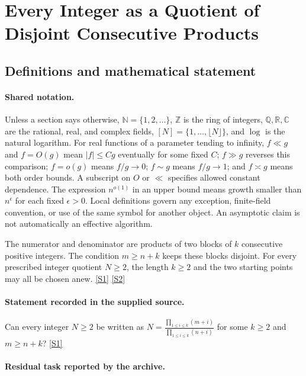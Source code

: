 \documentclass[11pt,a4paper]{article}
\newcommand{\N}{\mathbb{N}}
\newcommand{\Z}{\mathbb{Z}}
\newcommand{\Q}{\mathbb{Q}}
\newcommand{\R}{\mathbb{R}}
\newcommand{\C}{\mathbb{C}}
\newcommand{\sref}[2]{\hyperlink{source:#1:#2}{[S#2]}}
\begin{document}
\section{Every Integer as a Quotient of Disjoint Consecutive Products}\label{statement}


\subsection{Definitions and mathematical statement}

\paragraph{Shared notation.}Unless a section says otherwise, $\N=\{1,2,\ldots\}$,
$\Z$ is the ring of integers, $\Q,\R,\C$ are the rational, real, and complex
fields, $[N]=\{1,\ldots,\lfloor N\rfloor\}$, and $\log$ is the natural
logarithm. For real functions of a parameter tending to infinity,
$f\ll g$ and $f=O(g)$ mean $|f|\leq Cg$ eventually for some fixed $C$;
$f\gg g$ reverses this comparison; $f=o(g)$ means $f/g\to0$;
$f\sim g$ means $f/g\to1$; and $f\asymp g$ means both order bounds.
A subscript on $O$ or $\ll$ specifies allowed constant dependence.
The expression $n^{o(1)}$ in an upper bound means growth smaller than
$n^\epsilon$ for each fixed $\epsilon>0$. Local definitions govern any
exception, finite-field convention, or use of the same symbol for another
object. An asymptotic claim is not automatically an effective algorithm.



The numerator and denominator are products of two blocks of $k$ consecutive positive integers. The condition $m\geq n+k$ keeps these blocks disjoint. For every prescribed integer quotient $N\geq2$, the length $k\geq2$ and the two starting points may all be chosen anew. \sref{statement}{1} \sref{statement}{2}

\paragraph{Statement recorded in the supplied source.}
Can every integer $N\geq 2$ be written as $ N=\frac{\prod_{1\leq i\leq k}(m+i)}{\prod_{1\leq i\leq k}(n+i)} $ for some $k\geq 2$ and $m\geq n+k$? \sref{statement}{1}

\paragraph{Residual task reported by the archive.}
\end{document}
